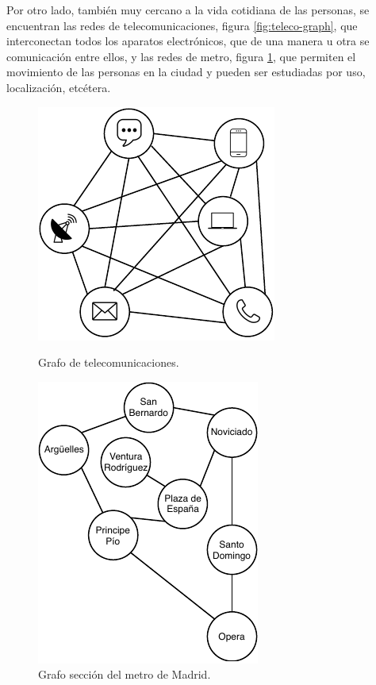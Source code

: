 Por otro lado, también muy cercano a la vida cotidiana de las personas, se encuentran las redes de telecomunicaciones, figura \ref{fig:teleco-graph}, que interconectan todos los aparatos electrónicos, que de una manera u otra se comunicación entre ellos, y las redes de metro, figura \ref{fig:metro-graph}, que permiten el movimiento de las personas en la ciudad y pueden ser estudiadas por uso, localización, etcétera.

\begin{figure}[H]
	\begin{minipage}[b]{0.5\linewidth}
			\centering
			\includegraphics[scale=0.8]{Figures/teleco-graph.pdf}
			\caption{Grafo de telecomunicaciones.}
			\label{fig:teleco-graph}
	\end{minipage}
	\begin{minipage}[b]{0.5\linewidth}
		\centering
		\includegraphics[scale=0.8]{Figures/metro-graph.pdf}
		\caption{Grafo sección del metro de Madrid.}
		\label{fig:metro-graph}
	\end{minipage}
\end{figure}

